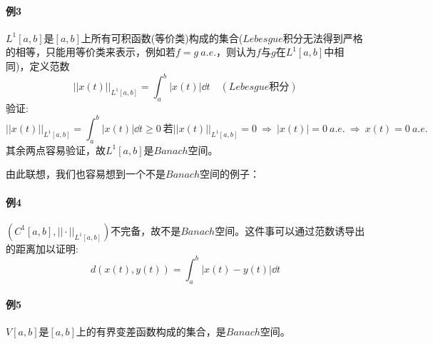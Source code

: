 \paragraph*{例3}$L^1[a,b]$是$[a,b]$上所有可积函数(等价类)构成的集合($Lebesgue$积分无法得到严格的相等，只能用等价类来表示，例如若$f=g \ a.e.$，则认为$f$与$g$在$L^1[a,b]$中相同)，定义范数
\[||x(t)||_{L^1[a,b]}=\int_a^b|x(t)|\dd t \quad (Lebesgue\text{积分})\]
验证:
\[||x(t)||_{L^1[a,b]}=\int_a^b|x(t)|\dd t \geq 0 \ \text{若}||x(t)||_{L^1[a,b]}=0 \ \Rightarrow \ |x(t)|=0 \ a.e. \ \Rightarrow \ x(t)=0 \ a.e.\]
其余两点容易验证，故$L^1[a,b]$是$Banach$空间。

由此联想，我们也容易想到一个不是$Banach$空间的例子：
\paragraph*{例4}$(C^1[a,b],||\cdot||_{L^1[a,b]})$不完备，故不是$Banach$空间。这件事可以通过范数诱导出的距离加以证明:
\[d(x(t),y(t))=\int_a^b|x(t)-y(t)|\dd t\]

\paragraph*{例5}$V[a,b]$是$[a,b]$上的有界变差函数构成的集合，是$Banach$空间。

